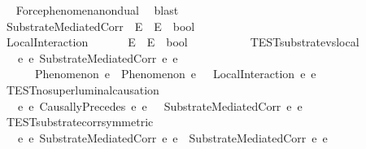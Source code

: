 \begin{isabellebody}
\ \ \ \ %
\endisadelimproof
%
\isatagproof
{}\isamarkupfalse%
\ Force{\isacharunderscore}{\kern0pt}phenomena{\isacharunderscore}{\kern0pt}nondual\ \isamarkupfalse%
\ blast%
\endisatagproof
{\isafoldproof}%
%
\isadelimproof
%
\endisadelimproof
%
\isadelimdocument
%
\endisadelimdocument
%
\isatagdocument
%
\isamarkuptrue%
%
\endisatagdocument
{\isafolddocument}%
%
\isadelimdocument
%
\endisadelimdocument
\ \ \isamarkupfalse%
\isanewline
\ \ \ \ SubstrateMediatedCorr\ {\isacharcolon}{\kern0pt}{\isacharcolon}{\kern0pt}\ {\isachardoublequoteopen}E\ {\isasymRightarrow}\ E\ {\isasymRightarrow}\ bool{\isachardoublequoteclose}\ \ \isanewline
\ \ \ \ LocalInteraction\ \ \ \ \ \ {\isacharcolon}{\kern0pt}{\isacharcolon}{\kern0pt}\ {\isachardoublequoteopen}E\ {\isasymRightarrow}\ E\ {\isasymRightarrow}\ bool{\isachardoublequoteclose}\ \ \isanewline
\isanewline
\ \ \isamarkupfalse%
\ \isanewline
\ \ \ \ TEST{}{\isacharunderscore}{\kern0pt}substrate{\isacharunderscore}{\kern0pt}vs{\isacharunderscore}{\kern0pt}local{\isacharcolon}{\kern0pt}\isanewline
\ \ \ \ \ \ {\isachardoublequoteopen}{\isasymforall}e{}\ e{}{\isachardot}{\kern0pt}\ SubstrateMediatedCorr\ e{}\ e{}\ {\isasymlongrightarrow}\isanewline
\ \ \ \ \ \ \ \ \ Phenomenon\ e{}\ {\isasymand}\ Phenomenon\ e{}\ {\isasymand}\ {\isasymnot}\ LocalInteraction\ e{}\ e{}{\isachardoublequoteclose}\ \isanewline
\ \ \ \ TEST{}{\isacharunderscore}{\kern0pt}no{\isacharunderscore}{\kern0pt}superluminal{\isacharunderscore}{\kern0pt}causation{\isacharcolon}{\kern0pt}\isanewline
\ \ \ \ \ \ {\isachardoublequoteopen}{\isasymforall}e{}\ e{}{\isachardot}{\kern0pt}\ CausallyPrecedes\ e{}\ e{}\ {\isasymlongrightarrow}\ {\isasymnot}\ SubstrateMediatedCorr\ e{}\ e{}{\isachardoublequoteclose}\ \isanewline
\ \ \ \ TEST{}{\isacharunderscore}{\kern0pt}substrate{\isacharunderscore}{\kern0pt}corr{\isacharunderscore}{\kern0pt}symmetric{\isacharcolon}{\kern0pt}\isanewline
\ \ \ \ \ \ {\isachardoublequoteopen}{\isasymforall}e{}\ e{}{\isachardot}{\kern0pt}\ SubstrateMediatedCorr\ e{}\ e{}\ {\isasymlongleftrightarrow}\ SubstrateMediatedCorr\ e{}\ e{}{\isachardoublequoteclose}\isanewline

\end{isabellebody}

